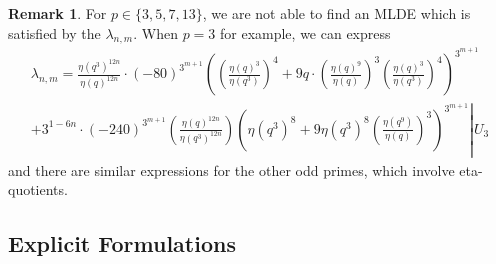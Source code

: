 \documentclass[10pt,a4paper]{amsart}
\numberwithin{equation}{section}
\theoremstyle{definition}
\newtheorem{Rem}[Th]{Remark}
\newcommand{\haupt}{\lambda}
\newcommand{\uthree}[1]{\left. #1 \right\rvert \hspace{1pt} U_{3}}
\begin{document}
\begin{Rem}
    For $p \in \lbrace 3,5,7,13 \rbrace$, we are not able to find an MLDE which is satisfied by the $\haupt_{n,m}$. When $p=3$ for example, we can express
    \begin{multline*}
        \haupt_{n,m} = \frac{\eta (q^{3})^{12n}}{\eta (q)^{12n}} \cdot (-80)^{3^{m+1}} \left( \left( \frac{\eta (q)^{3}}{\eta (q^{3})} \right)^{4} + 9q \cdot \left( \frac{\eta (q)^{9}}{\eta (q)} \right)^{3} \left( \frac{\eta (q)^{3}}{\eta (q^{3})} \right)^{4} \right)^{3^{m+1}} \\ + 3^{1-6n} \cdot (-240)^{3^{m+1}} \left( \frac{\eta (q)^{12n}}{\eta (q^{3})^{12n}} \right) \uthree{ \left( \eta (q^{3})^{8} + 9 \eta (q^{3})^{8} \left( \frac{\eta (q^{9})}{\eta (q)} \right)^{3} \right)^{3^{m+1}} }
    \end{multline*}
    and there are similar expressions for the other odd primes, which involve eta-quotients.
\end{Rem}

\subsection{Explicit Formulations}
\end{document}
